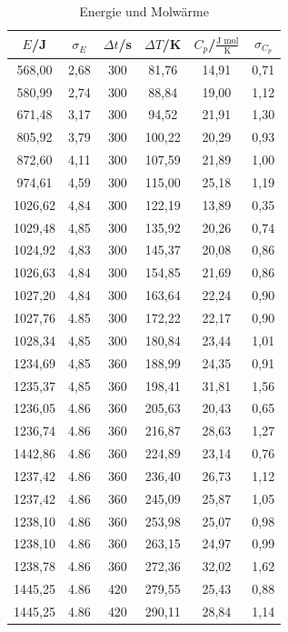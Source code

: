 \begin{table}[H]
	\begin{center}
		\begin{tabular}{c c c c c c}
			\toprule
			\(E\)/J & \(\sigma_E\) & \(\Delta t\)/s & \(\Delta T\)/K & \(C_p\)/\(\frac{\text{J mol}}{\text{K}}\) & \(\sigma_{C_p}\) \\
			\midrule
			568,00	&2,68	&300	&81,76	&14,91	&0,71\\
			580,99	&2,74	&300	&88,84	&19,00	&1,12\\
			671,48	&3,17	&300	&94,52	&21,91	&1,30\\
			805,92	&3,79	&300	&100,22	&20,29	&0,93\\
			872,60	&4,11	&300	&107,59	&21,89	&1,00\\
			974,61	&4,59	&300	&115,00	&25,18	&1,19\\
			1026,62	&4,84	&300	&122,19	&13,89	&0,35\\
			1029,48	&4,85	&300	&135,92	&20,26	&0,74\\                           
			1024,92	&4,83	&300	&145,37	&20,08	&0,86\\
			1026,63	&4,84	&300	&154,85	&21,69	&0,86\\ 
			1027,20	&4,84	&300	&163,64	&22,24	&0,90\\
			1027,76	&4.85	&300	&172,22	&22,17	&0,90\\
			1028,34	&4,85	&300	&180,84	&23,44	&1,01\\
			1234,69	&4,85	&360	&188,99	&24,35	&0,91\\
			1235,37	&4,85	&360	&198,41	&31,81	&1,56\\
			1236,05	&4.86	&360	&205,63	&20,43	&0,65\\
			1236,74	&4.86	&360	&216,87	&28,63	&1,27\\                
			1442,86	&4.86	&360	&224,89	&23,14	&0,76\\                  
			1237,42	&4.86	&360	&236,40	&26,73	&1,12\\                    
			1237,42	&4.86	&360	&245,09	&25,87	&1,05\\
			1238,10	&4.86	&360	&253,98	&25,07	&0,98\\ 
			1238,10	&4.86	&360	&263,15	&24,97	&0,99\\            
			1238,78	&4.86	&360	&272,36	&32,02	&1,62\\
			1445,25	&4.86	&420	&279,55	&25,43	&0,88\\
			1445,25	&4.86	&420	&290,11	&28,84	&1,14\\
			\bottomrule
		\end{tabular}
		\caption{Energie und Molwärme}
		\label{fig:tab2}
	\end{center}
\end{table}

